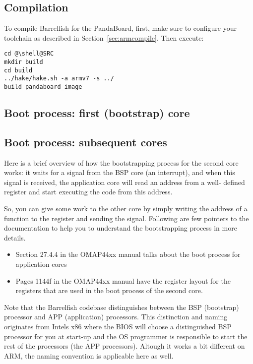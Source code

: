 \documentclass[a4paper,twoside]{report} %
\newcommand{\todo}[1]{\note{\textbf{TODO:} #1}}
\begin{document}
\subsection{Compilation}

To compile Barrelfish for the PandaBoard, first, make sure to
configure your toolchain as described in
Section~\ref{sec:armcompile}. Then execute:

\begin{lstlisting}
cd @\shell@SRC
mkdir build
cd build
../hake/hake.sh -a armv7 -s ../
build pandaboard_image
\end{lstlisting}

\subsection{Boot process: first (bootstrap) core}

\todo{From AOS writeup?}

\subsection{Boot process: subsequent cores}


Here is a brief overview of how the bootstrapping process for the second core
works: it waits for a signal from the BSP core (an interrupt), and when this
signal is received, the application core will read an address from a well-
defined register and start executing the code from this address.

So, you can give some work to the other core by simply writing the address of
a function to the register and sending the signal. Following are few pointers
to the documentation to help you to understand the bootstrapping process
in more details.

\begin{itemize}
\item Section 27.4.4 in the OMAP44xx manual talks about the boot process for
  application cores
\item Pages 1144f in the OMAP44xx manual have the register layout for the
  registers that are used in the boot process of the second core.
\end{itemize}

Note that the Barrelfish codebase distinguishes between the BSP (bootstrap)
processor and APP (application) processors. This distinction and naming
originates from Intels x86 where the BIOS will choose a distinguished BSP processor
for you at start-up and the OS programmer is responsible to start the rest
of the processors (the APP processors). Altough it works a bit different on
ARM, the naming convention is applicable here as well.
\end{document}
